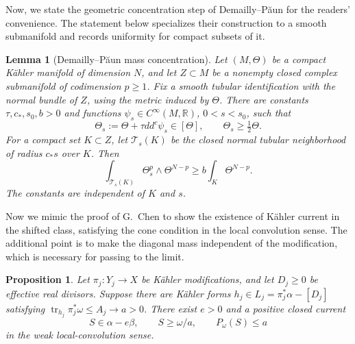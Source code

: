 \documentclass[reqno]{amsart}
\numberwithin{equation}{section}
\newtheorem{proposition}[theorem]{Proposition}
\newtheorem{lemma}[theorem]{Lemma}
\theoremstyle{definition}
\DeclareMathOperator{\tr}{tr}
\begin{document}
Now, we state the geometric concentration step of
Demailly--P\u{a}un \cite[Lemma~2.1(iii)--(iv)]{DP04} for the readers' convenience.
The statement below specializes their construction to a smooth
submanifold and records uniformity for compact subsets of it.
\begin{lemma}[Demailly--P\u{a}un mass concentration]
\label{lem:dp-concentration}
Let $(M,\Theta)$ be a compact K\"ahler manifold of dimension $N$,
and let $Z\subset M$ be a nonempty closed complex submanifold of
codimension $p\ge1$.
Fix a smooth tubular identification with the normal bundle of $Z$,
using the metric induced by $\Theta$.
There are constants $\tau,c_*,s_0,b>0$ and functions
$\psi_s\in C^\infty(M,\mathbb R)$, $0<s<s_0$, such that
\begin{equation}\label{eq:dp-forms}
 \Theta_s:=\Theta+\tau dd^c\psi_s\in[\Theta],
 \qquad \Theta_s\ge\tfrac12\Theta.
\end{equation}
For a compact set $K\subset Z$, let $\mathcal T_s(K)$ be the closed
normal tubular neighborhood of radius $c_*s$ over $K$. Then
\begin{equation}\label{eq:dp-mass}
 \int_{\mathcal T_s(K)}\Theta_s^p\wedge\Theta^{N-p}
       \ge b\int_K\Theta^{N-p}.
\end{equation}
The constants are independent of $K$ and $s$.
\end{lemma}


Now we mimic the proof of G.~Chen \cite{C21} to show the existence of K\"ahler current in the shifted class, satisfying the cone condition in the local convolution sense. The additional point is to make the diagonal mass independent of the modification, which is necessary for passing to the limit.
\begin{proposition}\label{prop:concentration}
Let $\pi_j:Y_j\to X$ be K\"ahler modifications, and let $D_j\ge0$ be effective real divisors.
Suppose there are K\"ahler forms
$h_j\in L_j=\pi_j^*\alpha-[D_j]$ satisfying
$\tr_{h_j}\pi_j^*\omega\le A_j\to a>0$.
There exist $e>0$ and a positive closed current
\begin{equation}\label{eq:shifted-current}
 S\in\alpha-e\beta,\qquad S\ge\omega/a,\qquad P_\omega(S)\le a
\end{equation}
in the weak local-convolution sense.
\end{proposition}
\end{document}
